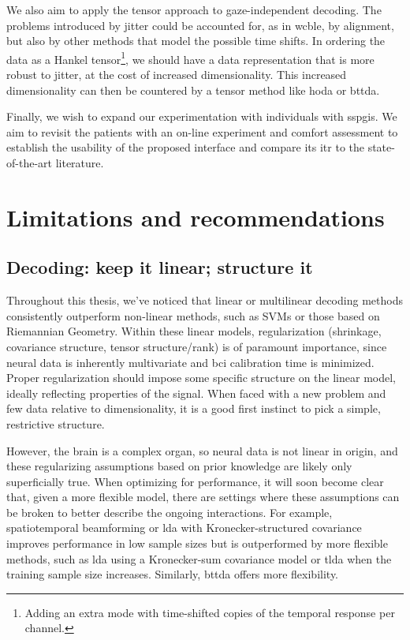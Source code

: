 We also aim to apply the tensor approach to gaze-independent decoding.
The problems introduced by jitter could be accounted for, as in \ac{wcble}, by
alignment, but also by other methods that model the possible time shifts.
In ordering the data as a Hankel tensor\footnote{Adding an extra mode with
time-shifted copies of the temporal response per channel.}, we should have a
data representation that is more robust to jitter, at the cost of increased
dimensionality.
This increased dimensionality can then be countered by a tensor method like
\ac{hoda} or \ac{bttda}.

Finally, we wish to expand our experimentation with individuals with
\acp{sspgi}.
We aim to revisit the patients with an on-line experiment and comfort
assessment to establish the usability of the proposed interface and compare its
\ac{itr} to the state-of-the-art literature.


\section{Limitations and recommendations}

\subsection{Decoding: keep it linear; structure it}

Throughout this thesis, we've noticed that linear or multilinear decoding
methods consistently outperform non-linear methods, such as SVMs or those based
on Riemannian Geometry.
Within these linear models, regularization (shrinkage, covariance structure,
tensor structure/rank) is of paramount importance, since neural data is
inherently multivariate and \ac{bci} calibration time is minimized.
Proper regularization should impose some specific structure on the linear model,
ideally reflecting properties of the signal.
When faced with a new problem and few data relative to dimensionality, it is a
good first instinct to pick a simple, restrictive structure.

However, the brain is a complex organ, so neural data is not linear in origin, and
these regularizing assumptions based on prior knowledge are likely only
superficially true.
When optimizing for performance, it will soon become clear that, given a more
flexible model, there are
settings where these assumptions can be broken to better describe the ongoing
interactions.
For example, spatiotemporal beamforming or \ac{lda} with Kronecker-structured covariance
improves performance in low sample sizes but is outperformed by more flexible
methods, such as \ac{lda} using a Kronecker-sum covariance model or \ac{tlda}
when the training sample size increases.
Similarly, \ac{bttda} offers more flexibility.

